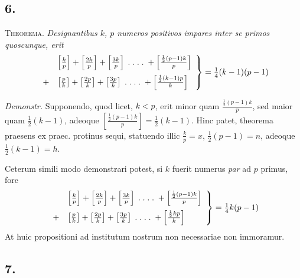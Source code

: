 \documentclass[14pt]{memoir}
\begin{document}
\subsection*{6.} 

\textsc{Theorema}. \textit{Designantibus \(k\), \(p\) numeros positivos impares inter se primos quoscunque, erit }
\[ \left. \begin{array}{rl}& \left[\frac{k}{p}\right] + \left[\frac{2k}{p}\right] + \left[\frac{3k}{p}\right] \;.\;.\;.\;.\; + \left[\frac{\frac{1}{2}(p-1)k}{p}\right] \vspace{2mm} \\
+& \left[\frac{p}{k}\right] + \left[\frac{2p}{k}\right] + \left[\frac{3p}{k}\right] \;.\;.\;.\;.\; + \left[\frac{\frac{1}{2}(k-1)p}{k}\right] \end{array} \right\} = \tfrac{1}{4}(k-1)(p-1) \]

\textit{Demonstr.} Supponendo, quod licet, \(k<p\), erit minor quam \(\tfrac{\frac{1}{2}(p-1)k}{p}\), 
sed maior quam \(\tfrac{1}{2}(k-1)\), adeoque \(\left[\tfrac{ \frac{1}{2}(p-1)k}{p}\right] = \tfrac{1}{2}(k-1)\). Hinc patet, theorema praesens ex praec. protinus sequi, statuendo illic \(\tfrac{k}{p}=x\), \(\tfrac{1}{2}(p-1)=n\), adeoque \(\tfrac{1}{2}(k-1) = h\). %


Ceterum simili modo demonstrari potest, si \(k\) fuerit numerus \textit{par} ad \(p\) primus, fore 
\[ \left. \begin{array}{rl} &\left[\frac{k}{p}\right] + \left[\frac{2k}{p}\right] + \left[\frac{3k}{p}\right] \;.\;.\;.\;.\; + \left[\frac{\frac{1}{2}(p-1)k}{p}\right]  \vspace{2mm}\\
+& \left[\frac{p}{k}\right] + \left[\frac{2p}{k}\right] + \left[\frac{3p}{k}\right] \;.\;.\;.\;.\; + \left[\frac{\frac{1}{2}kp}{k}\right] \end{array} \right\} = \tfrac{1}{4}k(p-1) \]
At huic propositioni ad institutum nostrum non necessariae non immoramur. 

\subsection*{7.}
\end{document}
